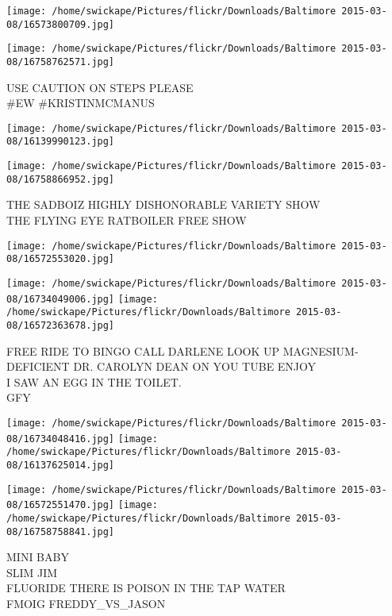 \documentclass[10pt,letterpaper]{article}
\begin{document}
\texttt{[image: /home/swickape/Pictures/flickr/Downloads/Baltimore 2015-03-08/16573800709.jpg]}

\vspace{0.25in}
\texttt{[image: /home/swickape/Pictures/flickr/Downloads/Baltimore 2015-03-08/16758762571.jpg]}

USE CAUTION ON STEPS PLEASE\\
\#EW \#KRISTINMCMANUS\\
\pagebreak

\texttt{[image: /home/swickape/Pictures/flickr/Downloads/Baltimore 2015-03-08/16139990123.jpg]}

\vspace{0.25in}
\texttt{[image: /home/swickape/Pictures/flickr/Downloads/Baltimore 2015-03-08/16758866952.jpg]}

THE SADBOIZ HIGHLY DISHONORABLE VARIETY SHOW\\
THE FLYING EYE RATBOILER FREE SHOW\\
\pagebreak

\texttt{[image: /home/swickape/Pictures/flickr/Downloads/Baltimore 2015-03-08/16572553020.jpg]}

\vspace{0.25in}
\texttt{[image: /home/swickape/Pictures/flickr/Downloads/Baltimore 2015-03-08/16734049006.jpg]}
\texttt{[image: /home/swickape/Pictures/flickr/Downloads/Baltimore 2015-03-08/16572363678.jpg]}

FREE RIDE TO BINGO CALL DARLENE LOOK UP MAGNESIUM{-}DEFICIENT DR. CAROLYN DEAN ON YOU TUBE ENJOY\\
I SAW AN EGG IN THE TOILET.\\
GFY\\
\pagebreak

\texttt{[image: /home/swickape/Pictures/flickr/Downloads/Baltimore 2015-03-08/16734048416.jpg]}
\texttt{[image: /home/swickape/Pictures/flickr/Downloads/Baltimore 2015-03-08/16137625014.jpg]}

\texttt{[image: /home/swickape/Pictures/flickr/Downloads/Baltimore 2015-03-08/16572551470.jpg]}
\texttt{[image: /home/swickape/Pictures/flickr/Downloads/Baltimore 2015-03-08/16758758841.jpg]}

MINI BABY\\
SLIM JIM\\
FLUORIDE THERE IS POISON IN THE TAP WATER\\
FMOIG FREDDY\_VS\_JASON\\
\pagebreak
\end{document}
